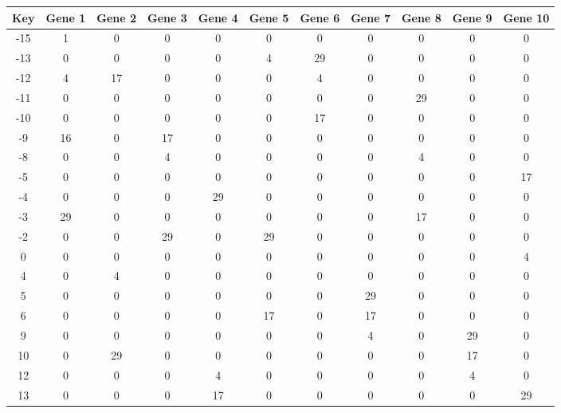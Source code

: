 \begin{tabular}{|c|c|c|c|c|c|c|c|c|c|c|}
\hline
Key & Gene 1 & Gene 2 & Gene 3 & Gene 4 & Gene 5 & Gene 6 & Gene 7 & Gene 8 & Gene 9 & Gene 10 \\
\hline
-15 & 1 & 0 & 0 & 0 & 0 & 0 & 0 & 0 & 0 & 0 \\
-13 & 0 & 0 & 0 & 0 & 4 & 29 & 0 & 0 & 0 & 0 \\
-12 & 4 & 17 & 0 & 0 & 0 & 4 & 0 & 0 & 0 & 0 \\
-11 & 0 & 0 & 0 & 0 & 0 & 0 & 0 & 29 & 0 & 0 \\
-10 & 0 & 0 & 0 & 0 & 0 & 17 & 0 & 0 & 0 & 0 \\
-9 & 16 & 0 & 17 & 0 & 0 & 0 & 0 & 0 & 0 & 0 \\
-8 & 0 & 0 & 4 & 0 & 0 & 0 & 0 & 4 & 0 & 0 \\
-5 & 0 & 0 & 0 & 0 & 0 & 0 & 0 & 0 & 0 & 17 \\
-4 & 0 & 0 & 0 & 29 & 0 & 0 & 0 & 0 & 0 & 0 \\
-3 & 29 & 0 & 0 & 0 & 0 & 0 & 0 & 17 & 0 & 0 \\
-2 & 0 & 0 & 29 & 0 & 29 & 0 & 0 & 0 & 0 & 0 \\
0 & 0 & 0 & 0 & 0 & 0 & 0 & 0 & 0 & 0 & 4 \\
4 & 0 & 4 & 0 & 0 & 0 & 0 & 0 & 0 & 0 & 0 \\
5 & 0 & 0 & 0 & 0 & 0 & 0 & 29 & 0 & 0 & 0 \\
6 & 0 & 0 & 0 & 0 & 17 & 0 & 17 & 0 & 0 & 0 \\
9 & 0 & 0 & 0 & 0 & 0 & 0 & 4 & 0 & 29 & 0 \\
10 & 0 & 29 & 0 & 0 & 0 & 0 & 0 & 0 & 17 & 0 \\
12 & 0 & 0 & 0 & 4 & 0 & 0 & 0 & 0 & 4 & 0 \\
13 & 0 & 0 & 0 & 17 & 0 & 0 & 0 & 0 & 0 & 29 \\
\hline
\end{tabular}